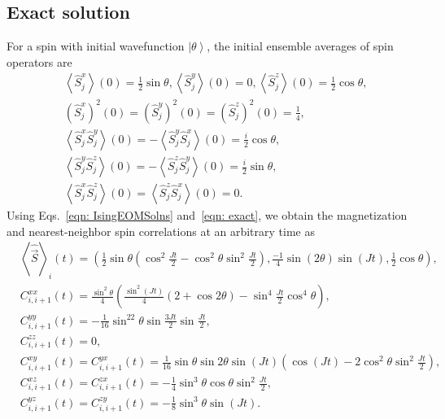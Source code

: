 \documentclass[pra,reprint,superscriptaddress]{revtex4-1}
\newcommand{\ket}[1]{\left| #1 \right\rangle}
\newcommand{\expect}[1]{\left\langle #1 \right\rangle}
\newcommand{\hS}{\hat{S}}
\begin{document}
\newpage
\begin{widetext}
\subsection{Exact solution}
For a spin with initial wavefunction $\ket{\theta}$, the initial ensemble averages of spin operators are
\begin{align}\label{eqn: exact}
&\expect{\hS^x_j}(0) = \frac{1}{2}\sin\theta, \expect{\hS^y_j}(0) = 0, \expect{\hS^z_j}(0) = \frac{1}{2}\cos\theta,\nonumber\\
&\left(\hS^x_j\right)^2(0) = \left(\hS^y_j\right)^2(0) = \left(\hS^z_j\right)^2(0) = \frac{1}{4},\nonumber\\
&\expect{\hS^x_j\hS^y_j}(0) = -\expect{\hS^y_j\hS^x_j}(0) = \frac{i}{2}\cos\theta,\nonumber\\
&\expect{\hS^y_j\hS^z_j}(0) = -\expect{\hS^z_j\hS^y_j}(0) = \frac{i}{2}\sin\theta, \nonumber\\
&\expect{\hS^x_j\hS^z_j}(0) = \expect{\hS^z_j\hS^x_j}(0) = 0.
\end{align}
Using Eqs.~\eqref{eqn: IsingEOMSolns} and~\eqref{eqn: exact}, we obtain the magnetization and nearest-neighbor spin correlations at an arbitrary time as
\begin{align}
&\expect{\hat{\vec{S}}}_i(t) = \left(\frac{1}{2}\sin\theta\left(\cos^2\frac{Jt}{2}-\cos^2\theta\sin^2\frac{Jt}{2}\right), \frac{-1}{4}\sin(2\theta)\sin(Jt), \frac{1}{2}\cos\theta\right), \nonumber\\
&C^{xx}_{i,i+1}(t) = \frac{\sin^2\theta}{4} \left(\frac{\sin^2(Jt)}{4}(2+\cos2\theta)-\sin^4\frac{Jt}{2}\cos^4\theta\right),\nonumber\\
&C^{yy}_{i,i+1}(t) = -\frac{1}{16}\sin^22\theta\sin\frac{3Jt}{2}\sin\frac{Jt}{2},\nonumber\\
&C^{zz}_{i,i+1}(t) = 0, \nonumber\\
&C^{xy}_{i,i+1}(t) = C^{yx}_{i,i+1}(t) = \frac{1}{16}\sin\theta\sin2\theta\sin(Jt) \left(\cos(Jt)-2\cos^2\theta\sin^2\frac{Jt}{2}\right), \nonumber\\
&C^{xz}_{i,i+1}(t) = C^{zx}_{i,i+1}(t) = -\frac{1}{4}\sin^3\theta\cos\theta\sin^2\frac{Jt}{2},\nonumber\\
&C^{yz}_{i,i+1}(t) = C^{zy}_{i,i+1}(t) = -\frac{1}{8}\sin^3\theta\sin(Jt). \label{eqn: exactSoln}
\end{align}


\end{widetext}
\end{document}
